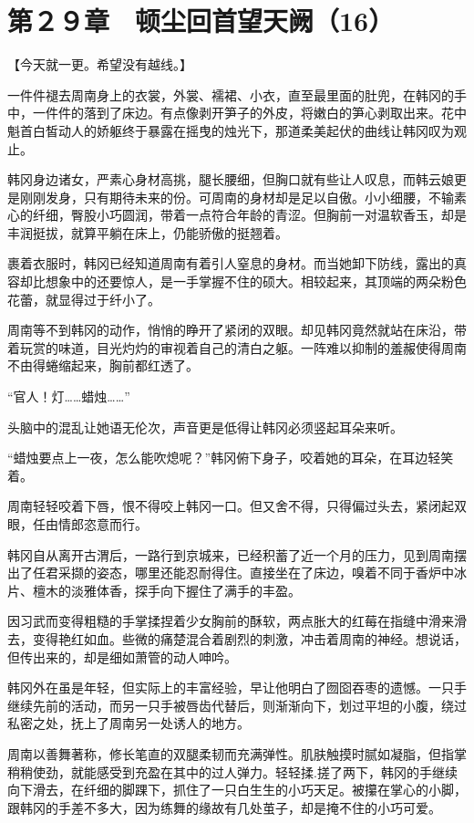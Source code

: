 \section{第２９章　顿尘回首望天阙（16） }

【今天就一更。希望没有越线。】

一件件褪去周南身上的衣裳，外裳、襦裙、小衣，直至最里面的肚兜，在韩冈的手中，一件件的落到了床边。有点像剥开笋子的外皮，将嫩白的笋心剥取出来。花中魁首白皙动人的娇躯终于暴露在摇曳的烛光下，那道柔美起伏的曲线让韩冈叹为观止。

韩冈身边诸女，严素心身材高挑，腿长腰细，但胸口就有些让人叹息，而韩云娘更是刚刚发身，只有期待未来的份。可周南的身材却是足以自傲。小小细腰，不输素心的纤细，臀股小巧圆润，带着一点符合年龄的青涩。但胸前一对温软香玉，却是丰润挺拔，就算平躺在床上，仍能骄傲的挺翘着。

裹着衣服时，韩冈已经知道周南有着引人窒息的身材。而当她卸下防线，露出的真容却比想象中的还要惊人，是一手掌握不住的硕大。相较起来，其顶端的两朵粉色花蕾，就显得过于纤小了。

周南等不到韩冈的动作，悄悄的睁开了紧闭的双眼。却见韩冈竟然就站在床沿，带着玩赏的味道，目光灼灼的审视着自己的清白之躯。一阵难以抑制的羞赧使得周南不由得蜷缩起来，胸前都红透了。

“官人！灯……蜡烛……”

头脑中的混乱让她语无伦次，声音更是低得让韩冈必须竖起耳朵来听。

“蜡烛要点上一夜，怎么能吹熄呢？”韩冈俯下身子，咬着她的耳朵，在耳边轻笑着。

周南轻轻咬着下唇，恨不得咬上韩冈一口。但又舍不得，只得偏过头去，紧闭起双眼，任由情郎恣意而行。

韩冈自从离开古渭后，一路行到京城来，已经积蓄了近一个月的压力，见到周南摆出了任君采撷的姿态，哪里还能忍耐得住。直接坐在了床边，嗅着不同于香炉中冰片、檀木的淡雅体香，探手向下握住了满手的丰盈。

因习武而变得粗糙的手掌揉捏着少女胸前的酥软，两点胀大的红莓在指缝中滑来滑去，变得艳红如血。些微的痛楚混合着剧烈的刺激，冲击着周南的神经。想说话，但传出来的，却是细如萧管的动人呻吟。

韩冈外在虽是年轻，但实际上的丰富经验，早让他明白了囫囵吞枣的遗憾。一只手继续先前的活动，而另一只手被唇齿代替后，则渐渐向下，划过平坦的小腹，绕过私密之处，抚上了周南另一处诱人的地方。

周南以善舞著称，修长笔直的双腿柔韧而充满弹性。肌肤触摸时腻如凝脂，但指掌稍稍使劲，就能感受到充盈在其中的过人弹力。轻轻揉.搓了两下，韩冈的手继续向下滑去，在纤细的脚踝下，抓住了一只白生生的小巧天足。被攥在掌心的小脚，跟韩冈的手差不多大，因为练舞的缘故有几处茧子，却是掩不住的小巧可爱。

